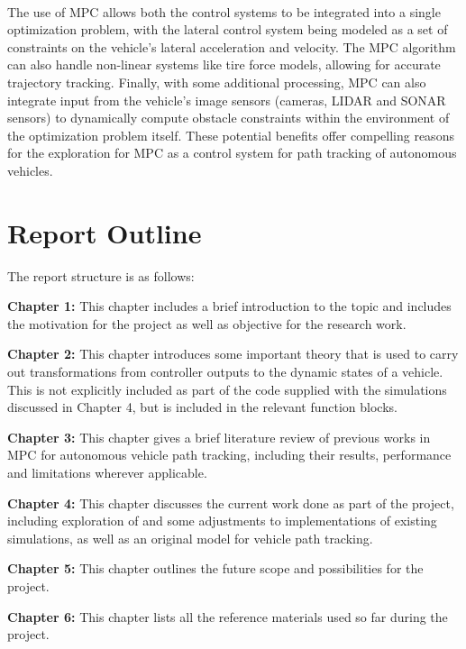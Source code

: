 \paragraph{}
The use of MPC allows both the control systems to be integrated into a single optimization problem, with the lateral control system being modeled as a set of constraints on the vehicle's lateral acceleration and velocity. The MPC algorithm can also handle non-linear systems like tire force models, allowing for accurate trajectory tracking. Finally, with some additional processing, MPC can also integrate input from the vehicle's image sensors (cameras, LIDAR and SONAR sensors) to dynamically compute obstacle constraints within the environment of the optimization problem itself. These potential benefits offer compelling reasons for the exploration for MPC as a control system for path tracking of autonomous vehicles.

\section{Report Outline}
\noindent The report structure is as follows:
\vspace{2.5mm}

\noindent \textbf{Chapter 1:} This chapter includes a brief introduction to the topic and includes the motivation for the project as well as objective for the research work.
\vspace{2.5mm}

\noindent \textbf{Chapter 2:} This chapter introduces some important theory that is used to carry out transformations from controller outputs to the dynamic states of a vehicle. This is not explicitly included as part of the code supplied with the simulations discussed in Chapter 4, but is included in the relevant function blocks.
\vspace{2.5mm}

\noindent \textbf{Chapter 3:} This chapter gives a brief literature review of previous works in MPC for autonomous vehicle path tracking, including their results, performance and limitations wherever applicable.
\vspace{2.5mm}

\noindent \textbf{Chapter 4:} This chapter discusses the current work done as part of the project, including exploration of and some adjustments to implementations of existing simulations, as well as an original model for vehicle path tracking.
\vspace{2.5mm}

\noindent \textbf{Chapter 5:} This chapter outlines the future scope and possibilities for the project.
\vspace{2.5mm}

\noindent \textbf{Chapter 6:} This chapter lists all the reference materials used so far during the project.

